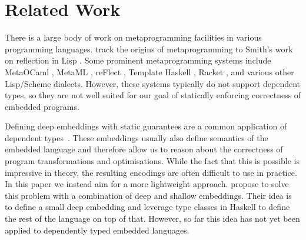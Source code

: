 \documentclass[sigplan,screen]{acmart}
\renewcommand\paragraph{\noindentparagraph}
\begin{document}





\section{\label{sec:related}Related Work}

There is a large body of
work on metaprogramming facilities in various programming
languages.  \citet{refl-masses} track the origins
of metaprogramming to Smith's work on reflection in Lisp \cite{refl-lisp}.
Some prominent metaprogramming systems include
MetaOCaml \cite{metaocaml}, Me\-taML \cite{metaml},
reFlect \cite{DBLP:journals/jfp/GrundyMO06},
Template Haskell \cite{sheard2002template},
Racket \cite{plt-tr1}, and various other Lisp/Scheme dialects.
%
However, these systems typically do not support dependent
types, so they are not well suited for our goal of statically
enforcing correctness of embedded programs.

Defining deep embeddings with static guarantees are a common application
of dependent types~\cite{10.5555/647849.737066,CHAPMAN200921,
10.1007/978-3-540-74464-1_7,10.1145/3236785,10.1145/1863495.1863497}.
%
These embeddings usually also define semantics of the embedded
language and therefore allow us to reason about the correctness
of program transformations and optimisations.
%
While the fact that this is possible is impressive in theory, the resulting
encodings are often difficult to use in practice. In this paper
we instead aim for a more lightweight approach.
%
\citet{deepshallow} propose to solve this problem with
a combination of deep and shallow embeddings.  Their idea is to define
a small deep embedding and leverage type classes in Haskell to define
the rest of the language on top of that.  However, so far this idea has not yet
been applied to dependently typed embedded languages.
\end{document}
